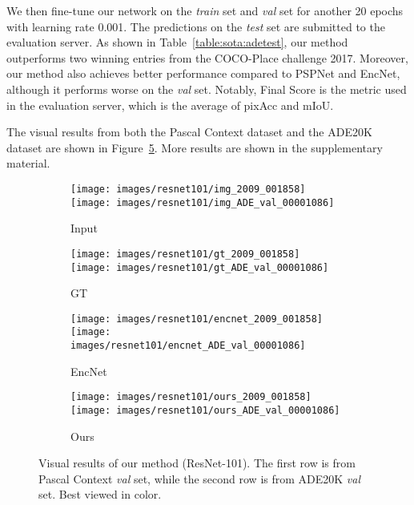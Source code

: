 \documentclass[10pt,twocolumn,letterpaper]{article}
\begin{document}
We then fine-tune our network on the \textit{train} set and \textit{val} set for another 20 epochs with learning rate 0.001.
The predictions on the \textit{test} set are submitted to the evaluation server.
As shown in Table~\ref{table:sota:adetest}, our method outperforms two winning entries from the COCO-Place challenge 2017.
Moreover, our method also achieves better performance compared to PSPNet and EncNet, although it performs worse on the \textit{val} set.
Notably, Final Score is the metric used in the evaluation server, which is the average of pixAcc and mIoU.

The visual results from both the Pascal Context dataset and the ADE20K dataset are shown in Figure~\ref{fig:resnet101}.
More results are shown in the supplementary material.
\begin{figure} 
\begin{center}
	\begin{subfigure}[b]{0.24\linewidth}
		\texttt{[image: images/resnet101/img\_2009\_001858]}\\
		\texttt{[image: images/resnet101/img\_ADE\_val\_00001086]}
      	\caption{Input}
      	\label{fig:resnet101:input}
    \end{subfigure}
    \hfill
    \begin{subfigure}[b]{0.24\linewidth}
		\texttt{[image: images/resnet101/gt\_2009\_001858]}\\
		\texttt{[image: images/resnet101/gt\_ADE\_val\_00001086]}
      	\caption{GT}
      	\label{fig:resnet101:gt}
    \end{subfigure}
    \hfill
	\begin{subfigure}[b]{0.24\linewidth}
		\texttt{[image: images/resnet101/encnet\_2009\_001858]}\\
		\texttt{[image: images/resnet101/encnet\_ADE\_val\_00001086]}
      	\caption{EncNet~\cite{zhang2018context}}
      	\label{fig:resnet101:encnet}
    \end{subfigure}
    \hfill
   	\begin{subfigure}[b]{0.24\linewidth}
		\texttt{[image: images/resnet101/ours\_2009\_001858]}\\
		\texttt{[image: images/resnet101/ours\_ADE\_val\_00001086]}
      	\caption{Ours}
      	\label{fig:resnet101:ours}
    \end{subfigure}
\end{center}
	\caption{Visual results of our method (ResNet-101). The first row is from Pascal Context \textit{val} set, while the second row is from ADE20K \textit{val} set. Best viewed in color.}
	\label{fig:resnet101}
\end{figure}
\end{document}
